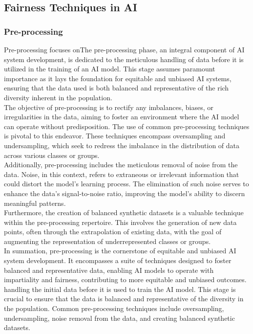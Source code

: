 \documentclass[12pt,a4paper,openright,twoside]{book}
\begin{document}
\subsection{Fairness Techniques in AI}

\subsubsection{Pre-processing}
Pre-processing focuses onThe pre-processing phase, an integral component of AI system development, is dedicated to the meticulous handling of data before it is utilized in the training of an AI model. This stage assumes paramount importance as it lays the foundation for equitable and unbiased AI systems, ensuring that the data used is both balanced and representative of the rich diversity inherent in the population. \\
The objective of pre-processing is to rectify any imbalances, biases, or irregularities in the data, aiming to foster an environment where the AI model can operate without predisposition. The use of common pre-processing techniques is pivotal to this endeavor. These techniques encompass oversampling and undersampling, which seek to redress the imbalance in the distribution of data across various classes or groups. \\
Additionally, pre-processing includes the meticulous removal of noise from the data. Noise, in this context, refers to extraneous or irrelevant information that could distort the model's learning process. The elimination of such noise serves to enhance the data's signal-to-noise ratio, improving the model's ability to discern meaningful patterns. \\
Furthermore, the creation of balanced synthetic datasets is a valuable technique within the pre-processing repertoire. This involves the generation of new data points, often through the extrapolation of existing data, with the goal of augmenting the representation of underrepresented classes or groups. \\
In summation, pre-processing is the cornerstone of equitable and unbiased AI system development. It encompasses a suite of techniques designed to foster balanced and representative data, enabling AI models to operate with impartiality and fairness, contributing to more equitable and unbiased outcomes. handling the initial data before it is used to train the AI model. This stage is crucial to ensure that the data is balanced and representative of the diversity in the population. Common pre-processing techniques include oversampling, undersampling, noise removal from the data, and creating balanced synthetic datasets.
\end{document}
